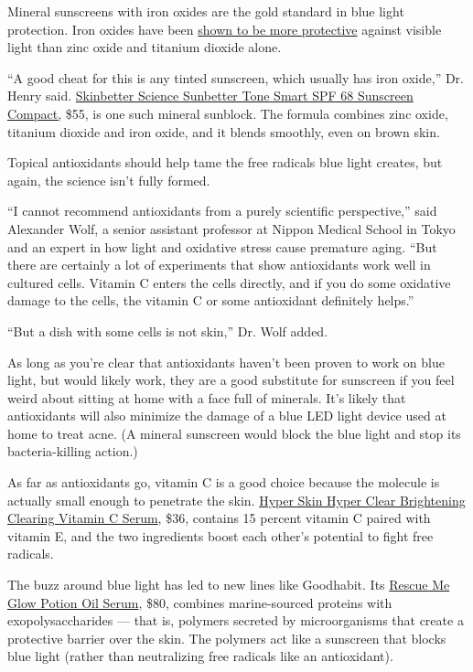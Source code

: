 Mineral sunscreens with iron oxides are the gold standard in blue light
protection. Iron oxides have been
\href{https://www.ncbi.nlm.nih.gov/pmc/articles/PMC6718061/}{shown to be
more protective} against visible light than zinc oxide and titanium
dioxide alone.

``A good cheat for this is any tinted sunscreen, which usually has iron
oxide,'' Dr. Henry said.
\href{https://skinbetter.com/products/sunbetter-tone-smart-spf-68-sunscreen-compact/}{Skinbetter
Science Sunbetter Tone Smart SPF 68 Sunscreen Compact,} \$55, is one
such mineral sunblock. The formula combines zinc oxide, titanium dioxide
and iron oxide, and it blends smoothly, even on brown skin.

Topical antioxidants should help tame the free radicals blue light
creates, but again, the science isn't fully formed.

``I cannot recommend antioxidants from a purely scientific
perspective,'' said Alexander Wolf, a senior assistant professor at
Nippon Medical School in Tokyo and an expert in how light and oxidative
stress cause premature aging. ``But there are certainly a lot of
experiments that show antioxidants work well in cultured cells. Vitamin
C enters the cells directly, and if you do some oxidative damage to the
cells, the vitamin C or some antioxidant definitely helps.''

``But a dish with some cells is not skin,'' Dr. Wolf added.

As long as you're clear that antioxidants haven't been proven to work on
blue light, but would likely work, they are a good substitute for
sunscreen if you feel weird about sitting at home with a face full of
minerals. It's likely that antioxidants will also minimize the damage of
a blue LED light device used at home to treat acne. (A mineral sunscreen
would block the blue light and stop its bacteria-killing action.)

As far as antioxidants go, vitamin C is a good choice because the
molecule is actually small enough to penetrate the skin.
\href{https://gethyperskin.com/products/hyper-clear}{Hyper Skin Hyper
Clear Brightening Clearing Vitamin C Serum}, \$36, contains 15 percent
vitamin C paired with vitamin E, and the two ingredients boost each
other's potential to fight free radicals.

The buzz around blue light has led to new lines like Goodhabit. Its
\href{https://goodhabitskin.com/products/glow-potion-oil-serum}{Rescue
Me Glow Potion Oil Serum}, \$80, combines marine-sourced proteins with
exopolysaccharides --- that is, polymers secreted by microorganisms that
create a protective barrier over the skin. The polymers act like a
sunscreen that blocks blue light (rather than neutralizing free radicals
like an antioxidant).

